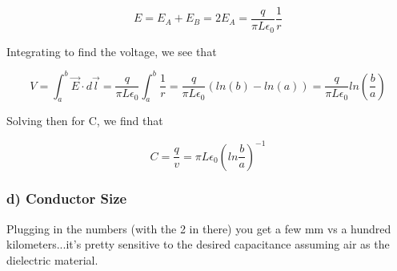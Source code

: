 \begin{equation}
  E = E_A + E_B = 2E_A = \frac{q}{\pi L \epsilon_0} \frac 1 r
\end{equation}

Integrating to find the voltage, we see that

\begin{equation}
  V = \int_a^b{\vec{E}\cdot d\vec{l}}
    = \frac{q}{\pi L \epsilon_0} \int_a^b{\frac 1 r}
    = \frac{q}{\pi L \epsilon_0} (ln(b)-ln(a))
    = \frac{q}{\pi L \epsilon_0} ln \left(\frac b a\right)
\end{equation}

Solving then for C, we find that

\begin{equation}
C = \frac q v = \pi L \epsilon_0 \left(ln \frac b a \right)^{-1}
\end{equation}

\subsubsection*{d) Conductor Size}


Plugging in the numbers (with the 2 in there) you get a few mm vs a
hundred kilometers...it's pretty sensitive to the desired capacitance
assuming air as the dielectric material.
